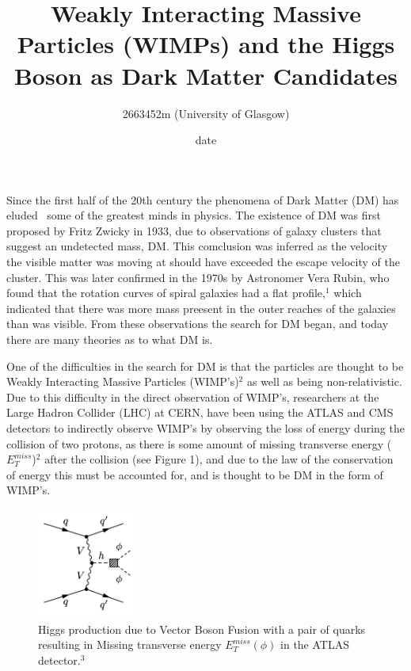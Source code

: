 \documentclass[]{article}
\title{\vspace{-8em}
\textbf{Weakly Interacting Massive Particles (WIMPs) 
and the Higgs Boson as Dark Matter Candidates }}
\author{2663452m (University of Glasgow)}
\date{date}
\begin{document}
\maketitle
Since the first half of the 20th century the phenomena of Dark Matter (DM) has eluded \
some of the greatest minds in physics. The existence of DM was first 
proposed by Fritz Zwicky in 1933, due to observations of galaxy clusters that suggest
an undetected mass, DM. This comclusion was inferred as the velocity the visible matter was
moving at should have exceeded the escape velocity of the cluster. 
This was later confirmed in the 1970s by Astronomer Vera Rubin, who found that
the rotation curves of spiral galaxies had a flat profile,$^1$ which indicated 
that there was more mass preesent in the outer reaches of the galaxies than 
was visible. From these observations the search for DM began, and today 
there are many theories as to what DM is.
\parskip 0.2cm


One of the difficulties in the search for DM is that the particles are thought 
to be Weakly Interacting Massive Particles (WIMP's)$^2$ as well as being non-relativistic.
Due to this difficulty in the direct observation of WIMP's, researchers
at the Large Hadron Collider (LHC) at CERN, have been using the ATLAS and CMS 
detectors to indirectly observe WIMP's by observing the loss of energy during the 
collision of two protons, as there is some amount of missing transverse energy ($E^{miss}_{T} $)$^2$
after the collision (see Figure 1), and due to the law of the conservation of energy
this must be accounted for, and is thought to be DM in the form of WIMP's. 



\begin{figure}[h]
\centering  
\includegraphics[width=0.3\textwidth]{images/Feynman Diagrams of missing Tranverse energy.png}
\caption{Higgs production due to Vector Boson Fusion with a pair of quarks resulting in Missing transverse energy $E^{miss}_{T} (\phi)$ in the ATLAS detector.$^3$}
\label{fig:missing_energy}
\end{figure}
\end{document}
